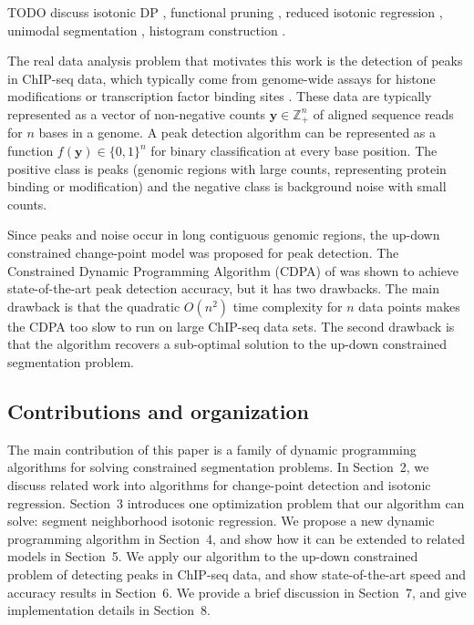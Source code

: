 \documentclass{article}
\newcommand{\ZZ}{\mathbb Z}
\begin{document}
TODO discuss isotonic DP \citep{isotonic-dp}, functional pruning
\citep{phd-johnson}, reduced isotonic regression
\citep{hardwick2014optimal, reduced-monotonic-regression}, unimodal
segmentation \citep{haiminen2008algorithms}, histogram construction
\citep{halim2009fast}.

The real data analysis problem that motivates this work is the
detection of peaks in ChIP-seq data, which typically come from
genome-wide assays for histone modifications or transcription factor
binding sites \citep{practical}. These data are typically represented
as a vector of non-negative counts $\mathbf y\in\ZZ_+^n$ of aligned
sequence reads for $n$ bases in a genome. A peak detection algorithm
can be represented as a function $f(\mathbf y)\in\{0,1\}^n$ for binary
classification at every base position. The positive class is peaks
(genomic regions with large counts, representing protein binding or
modification) and the negative class is background noise with small
counts.


Since peaks and noise occur in long contiguous genomic regions, the
up-down constrained change-point model was proposed for peak
detection. The Constrained Dynamic Programming Algorithm (CDPA) of
\citet{HOCKING-PeakSeg} was shown to achieve state-of-the-art peak
detection accuracy, but it has two drawbacks. The main drawback is
that the quadratic $O(n^2)$ time complexity for $n$ data points makes
the CDPA too slow to run on large ChIP-seq data sets. The second
drawback is that the algorithm recovers a sub-optimal solution to the
up-down constrained segmentation problem.

\subsection{Contributions and organization}

The main contribution of this paper is a family of dynamic programming
algorithms for solving constrained segmentation problems. In
Section~2, we discuss related work into algorithms for change-point
detection and isotonic regression. Section~3 introduces one
optimization problem that our algorithm can solve: segment
neighborhood isotonic regression. We propose a new dynamic programming
algorithm in Section~4, and show how it can be extended to related
models in Section~5. We apply our algorithm to the up-down constrained
problem of detecting peaks in ChIP-seq data, and show state-of-the-art
speed and accuracy results in Section~6. We provide a brief discussion in
Section~7, and give implementation details in Section~8.
\end{document}
